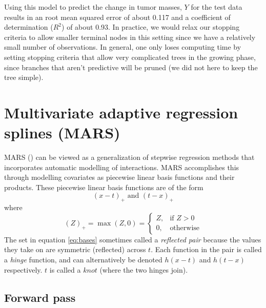 \documentclass[12pt]{article}
\begin{document}
Using this model to predict the change in tumor masses, $Y$ for the test data results in an root mean squared error of about 0.117 and a coefficient of determination ($R^2$) of about 0.93. In practice, we would relax our stopping criteria to allow smaller terminal nodes in this setting since we have a relatively small number of observations. In general, one only loses computing time by setting stopping criteria that allow very complicated trees in the growing phase, since branches that aren't predictive will be pruned (we did not here to keep the tree simple).




\section{Multivariate adaptive regression splines (MARS)} %
\label{sec:mars}

MARS (\cite{mars}) can be viewed as a generalization of stepwise regression methods that incorporates automatic modelling of interactions. MARS accomplishes this through modelling covariates as piecewise linear basis functions and their products. These piecewise linear basis functions are of the form 
%
\begin{equation} \label{eq:bases}
  (x - t)_{+} \text{ and } (t - x)_{+}
\end{equation} where
%
\begin{equation}
  (Z)_{+} = \max(Z, 0) = \begin{cases}
  Z, & \text{if } Z > 0 \\
  0, & \text{otherwise}
  \end{cases}
\end{equation}
The set in equation \ref{eq:bases} sometimes called a \emph{reflected pair} because the values they take on are symmetric (reflected) across $t$. Each function in the pair is called a \emph{hinge} function, and can alternatively be denoted $h(x - t)$ and $h(t - x)$ respectively. $t$ is called a $knot$ (where the two hinges join).

\subsection{Forward pass} %
\label{sub:forward_pass}
\end{document}
